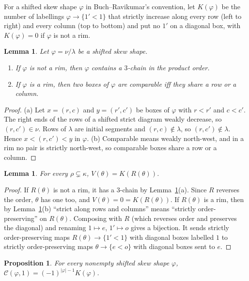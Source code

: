 \documentclass[11pt]{amsart}
\newtheorem{proposition}[theorem]{Proposition}
\newtheorem{lemma}[theorem]{Lemma}
\theoremstyle{definition}
\theoremstyle{remark}
\newcommand{\cC}{\mathcal{C}}
\begin{document}
For a shifted skew shape $\varphi$ in Buch--Ravikumar's convention, let $K(\varphi)$ be the
number of labellings $\varphi\to\{1'<1\}$ that strictly increase along every row (left to right)
and every column (top to bottom) and put no $1'$ on a diagonal box, with $K(\varphi)=0$ if
$\varphi$ is not a rim.

\begin{lemma}\label{lem:T}
Let $\varphi=\nu/\lambda$ be a shifted skew shape.
\begin{enumerate}[label=(\alph*)]
\item If $\varphi$ is not a rim, then $\varphi$ contains a $3$-chain in the product order.
\item If $\varphi$ is a rim, then two boxes of $\varphi$ are comparable iff they share a row or a column.
\end{enumerate}
\end{lemma}

\begin{proof}
(a) Let $x=(r,c)$ and $y=(r',c')$ be boxes of $\varphi$ with $r<r'$ and $c<c'$. The right ends of
the rows of a shifted strict diagram weakly decrease, so $(r,c')\in\nu$. Rows of $\lambda$ are
initial segments and $(r,c)\notin\lambda$, so $(r,c')\notin\lambda$. Hence $x<(r,c')<y$ in
$\varphi$. (b) Comparable means weakly north-west, and in a rim no pair is strictly north-west,
so comparable boxes share a row or a column.
\end{proof}

\begin{lemma}\label{lem:VK}
For every $\rho\subsetneq\kappa$, $V(\theta)=K(R(\theta))$.
\end{lemma}

\begin{proof}
If $R(\theta)$ is not a rim, it has a $3$-chain by Lemma~\ref{lem:T}(a). Since $R$ reverses
the order, $\theta$ has one too, and $V(\theta)=0=K(R(\theta))$. If $R(\theta)$ is a rim, then
by Lemma~\ref{lem:T}(b) ``strict along rows and columns'' means ``strictly order-preserving''
on $R(\theta)$. Composing with $R$ (which reverses order and preserves the diagonal) and
renaming $1\mapsto e$, $1'\mapsto o$ gives a bijection. It sends strictly order-preserving maps
$R(\theta)\to\{1'<1\}$ with diagonal boxes labelled $1$ to strictly order-preserving maps
$\theta\to\{e<o\}$ with diagonal boxes sent to $e$.
\end{proof}

\begin{proposition}\label{prop:BRp1}
For every nonempty shifted skew shape $\varphi$, $\cC(\varphi,1)=(-1)^{|\varphi|-1}K(\varphi)$.
\end{proposition}
\end{document}
